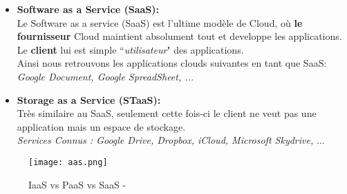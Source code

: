 \begin{itemize}
	
	\item \textbf{Software as a Service (SaaS):}\\
	
	Le Software as a service (SaaS) est l’ultime modèle de Cloud, où \textbf{le fournisseur} Cloud 
maintient absolument tout et developpe les applications.\\
	
	Le \textbf{client} lui est simple ``\emph{utilisateur}" des applications.\\
	
	Ainsi nous retrouvons les applications clouds suivantes en tant que SaaS: \emph{Google Document, Google SpreadSheet, ... }\\
			\vspace{8mm}

\item \textbf{Storage as a Service (STaaS):}\\

 Très similaire au SaaS, seulement cette fois-ci le client ne veut pas une application mais un espace de stockage.\\
 
 \emph{Services Connus : Google Drive, Dropbox, iCloud, Microsoft Skydrive,} ...

\end{itemize}
			\vspace{2cm}
 
\begin{figure}[H]
    \centering
    \texttt{[image: aas.png]}
	\caption{IaaS vs PaaS vs SaaS - 	\cite{image.aas.source}}\label{image.aas} 

\end{figure}